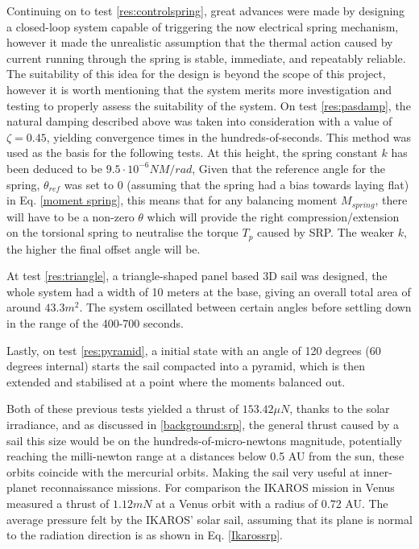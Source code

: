 Continuing on to test \ref{res:controlspring}, great advances were made by designing a closed-loop system capable of triggering the now electrical spring mechanism, however it made the unrealistic assumption that the thermal action caused by current running through the spring is stable, immediate, and repeatably reliable. The suitability of this idea for the design is beyond the scope of this project, however it is worth mentioning that the system merits more investigation and testing to properly assess the suitability of the system. On test \ref{res:pasdamp}, the natural damping described above was taken into consideration with a value of $\zeta = 0.45$, yielding convergence times in the hundreds-of-seconds. This method was used as the basis for the following tests. At this height, the spring constant $k$ has been deduced to be $9.5 \cdot 10^{-6} NM/rad$, Given that the reference angle for the spring, $\theta_{ref}$ was set to 0 (assuming that the spring had a bias towards laying flat) in Eq. \ref{moment spring}, this means that for any balancing moment $M_{spring}$, there will have to be a non-zero $\theta$ which will provide the right compression/extension on the torsional spring to neutralise the torque $T_p$ caused by SRP. The weaker $k$, the higher the final offset angle will be.


At test \ref{res:triangle}, a triangle-shaped panel based 3D sail was designed, the whole system had a width of 10 meters at the base, giving an overall total area of around $43.3m^2$. The system oscillated between certain angles before settling down in the range of the 400-700 seconds.

Lastly, on test \ref{res:pyramid}, a initial state with an angle of 120 degrees (60 degrees internal) starts the sail compacted into a pyramid, which is then extended and stabilised at a point where the moments balanced out.

Both of these previous tests yielded a thrust of $153.42 \mu N$, thanks to the solar irradiance, and as discussed in \ref{background:srp}, the general thrust caused by a sail this size would be on the hundreds-of-micro-newtons magnitude, potentially reaching the milli-newton range at a distances below 0.5 AU from the sun, these orbits coincide with the mercurial orbits. Making the sail very useful at inner-planet reconnaissance missions. For comparison the IKAROS mission in Venus measured a thrust of $1.12mN$ \cite{TakaoY} at a Venus orbit with a radius of 0.72 AU. The average pressure felt by the IKAROS' solar sail, assuming that its plane is normal to the radiation direction is as shown in Eq. \ref{Ikarossrp}.

